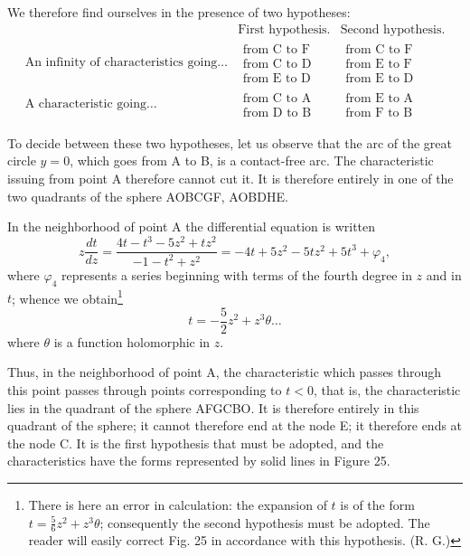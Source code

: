 \documentclass[11pt]{article}
\begin{document}
We therefore find ourselves in the presence of two hypotheses:
\[
\begin{array}{r|c|c}
& \text{First hypothesis.} & \text{Second hypothesis.}\\[0.2em]
\text{An infinity of characteristics going}\ldots &
\begin{array}{c}\text{from C to F}\\\text{from C to D}\\\text{from E to D}\end{array}&
\begin{array}{c}\text{from C to F}\\\text{from E to F}\\\text{from E to D}\end{array}\\[1em]
\text{A characteristic going}\ldots &
\begin{array}{c}\text{from C to A}\\\text{from D to B}\end{array}&
\begin{array}{c}\text{from E to A}\\\text{from F to B}\end{array}
\end{array}
\]

To decide between these two hypotheses, let us observe that the arc of the great circle $y=0$, which goes from A to B, is a contact-free arc. The characteristic issuing from point A therefore cannot cut it. It is therefore entirely in one of the two quadrants of the sphere AOBCGF, AOBDHE.

In the neighborhood of point A the differential equation is written
\[
z\frac{dt}{dz}
=\frac{4t-t^3-5z^2+tz^2}{-1-t^2+z^2}
=-4t+5z^2-5tz^2+5t^3+\varphi_4,
\]
where $\varphi_4$ represents a series beginning with terms of the fourth degree in $z$ and in $t$; whence we obtain\footnote{There is here an error in calculation: the expansion of $t$ is of the form $t=\frac56z^2+z^3\theta$; consequently the second hypothesis must be adopted. The reader will easily correct Fig. 25 in accordance with this hypothesis. \hfill(R. G.)}
\[
t=-\frac52 z^2+z^3\theta\ldots
\]
where $\theta$ is a function holomorphic in $z$.

Thus, in the neighborhood of point A, the characteristic which passes through this point passes through points corresponding to $t<0$, that is, the characteristic lies in the quadrant of the sphere AFGCBO. It is therefore entirely in this quadrant of the sphere; it cannot therefore end at the node E; it therefore ends at the node C. It is the first hypothesis that must be adopted, and the characteristics have the forms represented by solid lines in Figure 25.
\end{document}

